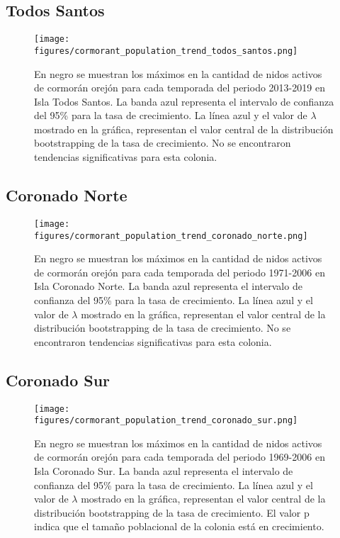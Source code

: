 \documentclass{article} %
\begin{document}
\subsection*{Todos Santos}

\begin{figure}[H]
\hspace{-2cm}
    \texttt{[image: figures/cormorant\_population\_trend\_todos\_santos.png]}
\caption{En negro se muestran los máximos en la cantidad de nidos activos de cormorán orejón para cada temporada del periodo 2013-2019 en Isla Todos Santos. La banda azul representa el intervalo de confianza del 95\% para la tasa de crecimiento. La línea azul y el valor de $\lambda$ mostrado en la gráfica, representan el valor central de la distribución bootstrapping de la tasa de crecimiento. No se encontraron tendencias significativas para esta colonia.}
\end{figure}

\subsection*{Coronado Norte}

\begin{figure}[H]
\hspace{-2cm}
    \texttt{[image: figures/cormorant\_population\_trend\_coronado\_norte.png]}
\caption{En negro se muestran los máximos en la cantidad de nidos activos de cormorán orejón para cada temporada del periodo 1971-2006 en Isla Coronado Norte. La banda azul representa el intervalo de confianza del 95\% para la tasa de crecimiento. La línea azul y el valor de $\lambda$ mostrado en la gráfica, representan el valor central de la distribución bootstrapping de la tasa de crecimiento. No se encontraron tendencias significativas para esta colonia.}
\end{figure}

\subsection*{Coronado Sur}

\begin{figure}[H]
\hspace{-2cm}
    \texttt{[image: figures/cormorant\_population\_trend\_coronado\_sur.png]}
\caption{En negro se muestran los máximos en la cantidad de nidos activos de cormorán orejón para cada temporada del periodo 1969-2006 en Isla Coronado Sur. La banda azul representa el intervalo de confianza del 95\% para la tasa de crecimiento. La línea azul y el valor de $\lambda$ mostrado en la gráfica, representan el valor central de la distribución bootstrapping de la tasa de crecimiento. El valor p indica que el tamaño poblacional de la colonia está en crecimiento.}
\end{figure}

 

\end{document}
